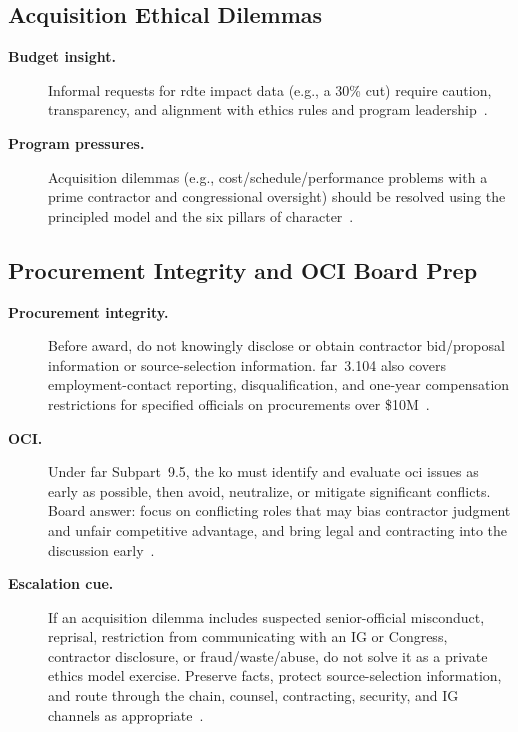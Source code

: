 \documentclass[../main.tex]{subfiles}
\begin{document}
\subsection{Acquisition Ethical Dilemmas}
\begin{description}
  \item[\textbf{Budget insight.}] Informal requests for \ac{rdte} impact data (e.g., a 30\% cut) require caution, transparency, and alignment with ethics rules and program leadership~\autocite{edo-5-1-3-ethics-and-acquisition-2025}.
  \item[\textbf{Program pressures.}] Acquisition dilemmas (e.g., cost/schedule/performance problems with a prime contractor and congressional oversight) should be resolved using the principled model and the six pillars of character~\autocite{edo-5-1-3-ethics-and-acquisition-2025}.
\end{description}

\subsection{Procurement Integrity and OCI Board Prep}
\begin{description}
  \item[\textbf{Procurement integrity.}] Before award, do not knowingly disclose or obtain contractor bid/proposal information or source-selection information. \ac{far}~3.104 also covers employment-contact reporting, disqualification, and one-year compensation restrictions for specified officials on procurements over \$10M~\autocite{FAR-3-104-Procurement-Integrity}.
  \item[\textbf{OCI.}] Under \ac{far} Subpart~9.5, the \ac{ko} must identify and evaluate \ac{oci} issues as early as possible, then avoid, neutralize, or mitigate significant conflicts. Board answer: focus on conflicting roles that may bias contractor judgment and unfair competitive advantage, and bring legal and contracting into the discussion early~\autocite{FAR-9-504-OCI,FAR-9-505-OCI}.
  \item[\textbf{Escalation cue.}] If an acquisition dilemma includes suspected senior-official misconduct, reprisal, restriction from communicating with an IG or Congress, contractor disclosure, or fraud/waste/abuse, do not solve it as a private ethics model exercise. Preserve facts, protect source-selection information, and route through the chain, counsel, contracting, security, and IG channels as appropriate~\autocite{DoW-OIG-Admin-Investigations-2026,DoW-OIG-AI-Manual-2025,FAR-3-104-Procurement-Integrity}.
\end{description}
\end{document}
